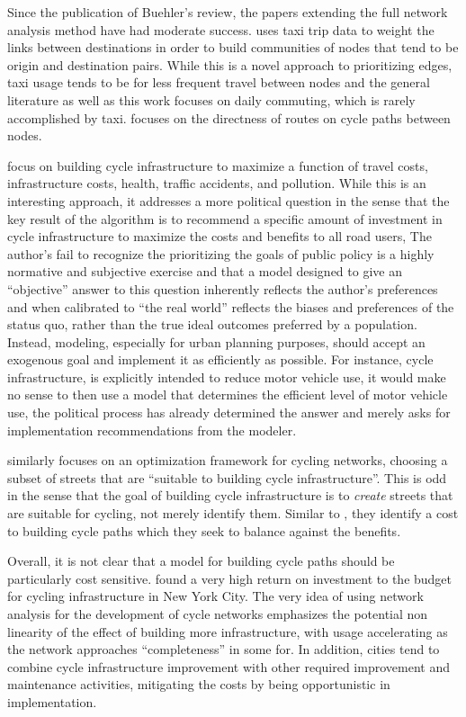 \documentclass[11pt]{article} %
\begin{document}
Since the publication of Buehler's review, the papers extending the full network analysis method have had moderate success. \cite{akbarzadeh2018designing} uses taxi trip data to weight the links between destinations in order to build communities of nodes that tend to be origin and destination pairs. While this is a novel approach to prioritizing edges, taxi usage tends to be for less frequent travel between nodes and the general literature as well as this work focuses on daily commuting, which is rarely accomplished by taxi. \cite{boisjoly2019bicycle} focuses on the directness of routes on cycle paths between nodes. 

\cite{doorley2019designing} focus on building cycle infrastructure to maximize a function of travel costs, infrastructure costs, health, traffic accidents, and pollution. While this is an interesting approach, it addresses a more political question in the sense that the key result of the algorithm is to recommend a specific amount of investment in cycle infrastructure to maximize the costs and benefits to all road users, The author's fail to recognize the prioritizing the goals of public policy is a highly normative and subjective exercise and that a model designed to give an ``objective'' answer to this question inherently reflects the author's preferences and when calibrated to ``the real world'' reflects the biases and preferences of the status quo, rather than the true ideal outcomes preferred by a population. Instead, modeling, especially for urban planning purposes, should accept an exogenous goal and implement it as efficiently as possible. For instance, cycle infrastructure, is explicitly intended to reduce motor vehicle use, it would make no sense to then use a model that determines the efficient level of motor vehicle use, the political process has already determined the answer and merely asks for implementation recommendations from the modeler. 

\cite{mauttone2017bicycle} similarly focuses on an optimization framework for cycling networks, choosing a subset of streets that are ``suitable to building cycle infrastructure''. This is odd in the sense that the goal of building cycle infrastructure is to \textit{create} streets that are suitable for cycling, not merely identify them. Similar to \cite{doorley2019designing}, they identify a cost to building cycle paths which they seek to balance against the benefits. 

Overall, it is not clear that a model for building cycle paths should be particularly cost sensitive. \cite{gu2017cost} found a very high return on investment to the budget for cycling infrastructure in New York City. The very idea of using network analysis for the development of cycle networks emphasizes the potential non linearity of the effect of building more infrastructure, with usage accelerating as the network approaches ``completeness'' in some for. In addition, cities tend to combine cycle infrastructure improvement with other required improvement and maintenance activities, mitigating the costs by being opportunistic in implementation. 
\end{document}
